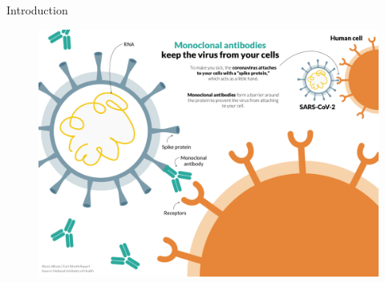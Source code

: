 \begin{frame}{Introduction}
    \begin{figure}
        \centering
        \includegraphics[width=\textwidth]{../Images/mab_covid.png}
        \label{fig:mab_covid}
    \end{figure}

\end{frame}